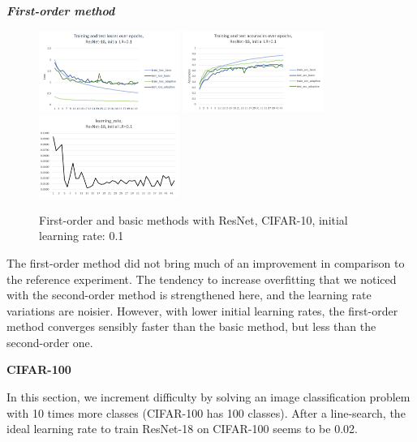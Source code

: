 \documentclass{article}
\begin{document}
  \emph{\textbf{First-order method}}
  
  \begin{figure}[!h]
	\includegraphics[width=130pt]{loss_resnet_fo_0_1.png}
	\includegraphics[width=130pt]{acc_resnet_fo_0_1.png}
	\includegraphics[width=130pt]{lr_resnet_fo_0_1.png}
	\caption{First-order and basic methods with ResNet, CIFAR-10, initial learning rate: 0.1}
  \end{figure}

   The first-order method did not bring much of an improvement in comparison to the reference experiment. The tendency to increase overfitting that we noticed with the second-order method is strengthened here, and the learning rate variations are noisier. However, with lower initial learning rates, the first-order method converges sensibly faster than the basic method, but less than the second-order one. 
  
  \textbf{CIFAR-100}
  
  In this section, we increment difficulty by solving an image classification problem with 10 times more classes (CIFAR-100 \cite{cifar} has 100 classes). After a line-search, the ideal learning rate to train ResNet-18 on CIFAR-100 seems to be 0.02.
\end{document}

